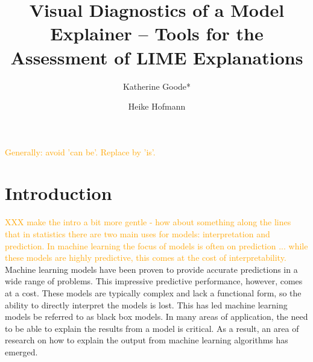 \documentclass[AMS,STIX2COL]{WileyNJD-v2}\usepackage[]{graphicx}\usepackage[]{color}
\newcommand{\hh}[1]{\textcolor{orange}{#1}}
\begin{document}
\title{Visual Diagnostics of a Model Explainer -- Tools for the Assessment of LIME Explanations}

\author[1]{Katherine Goode*}

\author[1,2]{Heike Hofmann}


\address[1]{, , }

\address[2]{, , }






\maketitle

\hh{Generally: avoid 'can be'. Replace by 'is'.  }

\section{Introduction}

\hh{XXX make the intro a bit more gentle - how about something along the lines that in statistics there are two main uses for models: interpretation and prediction. In machine learning the focus of models is often on prediction ... while these models are highly predictive, this comes at the cost of interpretability.}
Machine learning models have been proven to provide accurate predictions in a wide range of problems. This impressive predictive performance, however, comes at a cost. These models are typically complex and lack a functional form, so the ability to directly interpret the models is lost. This has led machine learning models be referred to as black box models. In many areas of application, the need to be able to explain the results from a model is critical. As a result, an area of research on how to explain the output from machine learning algorithms has emerged.
\end{document}
